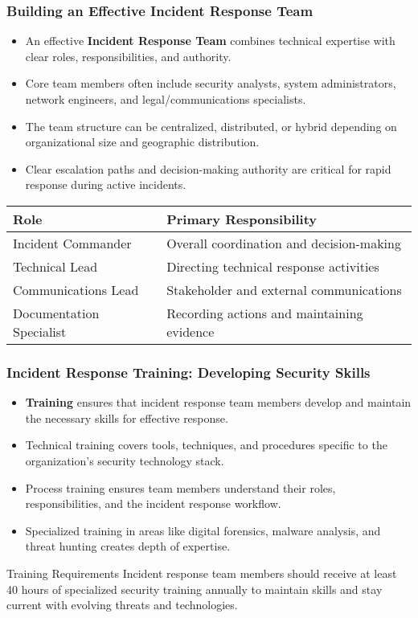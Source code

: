 \documentclass{beamer}
\begin{document}
\begin{frame}
\frametitle{Building an Effective Incident Response Team}
\begin{itemize}
\item An effective \textbf{Incident Response Team} combines technical expertise with clear roles, responsibilities, and authority.
\item Core team members often include security analysts, system administrators, network engineers, and legal/communications specialists.
\item The team structure can be centralized, distributed, or hybrid depending on organizational size and geographic distribution.
\item Clear escalation paths and decision-making authority are critical for rapid response during active incidents.
\end{itemize}

\begin{center}
\begin{tabular}{|l|l|}
\hline
\textbf{Role} & \textbf{Primary Responsibility} \\
\hline
Incident Commander & Overall coordination and decision-making \\
Technical Lead & Directing technical response activities \\
Communications Lead & Stakeholder and external communications \\
Documentation Specialist & Recording actions and maintaining evidence \\
\hline
\end{tabular}
\end{center}
\end{frame}

\begin{frame}
\frametitle{Incident Response Training: Developing Security Skills}
\begin{itemize}
\item \textbf{Training} ensures that incident response team members develop and maintain the necessary skills for effective response.
\item Technical training covers tools, techniques, and procedures specific to the organization's security technology stack.
\item Process training ensures team members understand their roles, responsibilities, and the incident response workflow.
\item Specialized training in areas like digital forensics, malware analysis, and threat hunting creates depth of expertise.
\end{itemize}

\begin{alertblock}{Training Requirements}
Incident response team members should receive at least 40 hours of specialized security training annually to maintain skills and stay current with evolving threats and technologies.
\end{alertblock}
\end{frame}
\end{document}
